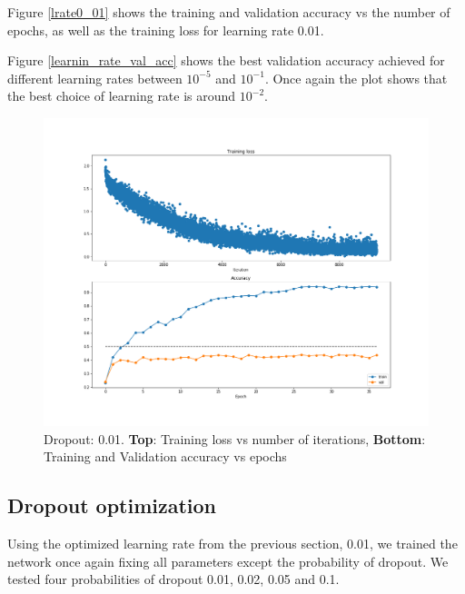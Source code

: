\documentclass[12pt,twoside]{article}
\begin{document}
Figure \ref{lrate0_01} shows the training and validation accuracy vs the number of epochs, as well as the training loss for learning rate 0.01.

Figure \ref{learnin_rate_val_acc} shows the best validation accuracy achieved for different learning rates between $10^{-5}$ and $10^{-1}$. Once again the plot shows that the best choice of learning rate is around $10^{-2}$.

\begin{figure}[!htbp]
\centering %
\includegraphics[width = 0.8\hsize]{./figures/drop_0_01.png} %
\caption{Dropout: 0.01. \textbf{Top}: Training loss vs number of iterations, \textbf{Bottom}: Training and Validation accuracy vs epochs} %
\label{dropout0_01}
\end{figure}

\subsection{Dropout optimization}

Using the optimized learning rate from the previous section, 0.01, we trained the network once again fixing all parameters except the probability of dropout. We tested four probabilities of dropout 0.01, 0.02, 0.05 and 0.1. 
\end{document}
